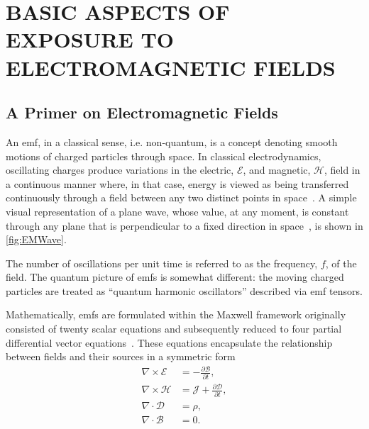 \cleardoublepage

\chapter{BASIC ASPECTS OF EXPOSURE TO ELECTROMAGNETIC FIELDS}
\label{chap:2}

\section{A Primer on Electromagnetic Fields}
An \gls{emf}, in a classical sense, i.e. non-quantum, is a concept denoting smooth motions of charged particles through space.
In classical electrodynamics, oscillating charges produce variations in the electric, $\mathcal{E}$, and magnetic, $\mathcal{H}$, field in a continuous manner where, in that case, energy is viewed as being transferred continuously through a field between any two distinct points in space~\cite{Griffiths2017Introduction}.
A simple visual representation of a plane wave, whose value, at any moment, is constant through any plane that is perpendicular to a fixed direction in space~\cite{Brekhovskikh1980Waves}, is shown in \cref{fig:EMWave}.

The number of oscillations per unit time is referred to as the frequency, $f$, of the field.
The quantum picture of \gls{emf}s is somewhat different: the moving charged particles are treated as ``quantum harmonic oscillators'' described via \gls{emf} tensors.

Mathematically, \gls{emf}s are formulated within the Maxwell framework originally consisted of twenty scalar equations and subsequently reduced to four partial differential vector equations~\cite{Hampshire2018derivation}.
These equations encapsulate the relationship between fields and their sources in a symmetric form~\cite{Poljak2006Advanced}
\begin{align}
    \label{eqn:maxwell-faraday}
    \nabla \times \mathcal{E} &= -\frac{\partial \mathcal{B}}{\partial t},\\
    \label{eqn:maxwell-ampere}
    \nabla \times\mathcal{H} &= \mathcal{J} + \frac{\partial \mathcal{D}}{\partial t},\\
    \label{eqn:maxwell-gauss}
    \nabla \cdot \mathcal{D} & = \rho,\\
    \label{eqn:maxwell-gauss-magnetics}
    \nabla \cdot \mathcal{B} &= 0.
\end{align}


